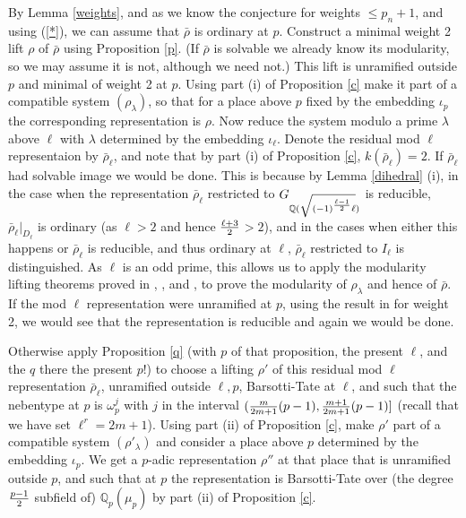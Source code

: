 \documentclass[12pt]{amsart}
\newcommand{\Q}{\mathbb{Q}}
\newcommand{\rhobar}{\overline{\rho}}
\def\rhobar{ {\bar {\rho} } }
\begin{document}
By  Lemma \ref{weights}, and as we know the conjecture for weights $\leq p_n+1$, and using (\ref{*}),
we can assume that $\rhobar$ is ordinary at $p$. 
Construct a minimal weight 2 
lift $\rho$ of $\rhobar$ using Proposition \ref{p}. (If $\rhobar$ is solvable we already know its modularity, so we may assume it is not, although we need not.) 
This lift is unramified outside $p$ and minimal of weight 2 at $p$.
Using part (i) of Proposition \ref{c} make it part of a compatible system $(\rho_{\lambda})$, so that for a place above $p$ fixed by the embedding $\iota_p$ the corresponding representation is $\rho$. 
Now reduce the system modulo a prime $\lambda$ above 
$\ell$ with $\lambda$ determined by the embedding $\iota_{\ell}$. 
Denote the residual  mod $\ell$ representaion by $\rhobar_\ell$, and note that by part (i) of Proposition \ref{c}, $k(\rhobar_\ell)=2$.
If $\rhobar_\ell$ had solvable image we would be done. This is because by Lemma \ref{dihedral} (i), 
in the case when the representation $\rhobar_\ell$ restricted to $G_{\Q(\sqrt{{(-1)}^{\ell-1 \over 2}\ell})}$ is reducible, 
$\rhobar_\ell|_{D_\ell}$ is ordinary (as $\ell>2$ and hence $\ell+3 \over 2$$>2$), 
and in the cases when either this happens or $\rhobar_\ell$ is reducible, and thus ordinary at $\ell$, 
$\rhobar_\ell$ restricted to $I_{\ell}$ is distinguished.  As $\ell$ is an odd prime, 
this allows us to apply the modularity lifting theorems 
proved in \cite{Wiles}, \cite{TW}, \cite{SW2} and \cite{SW3}, to prove the modularity of 
$\rho_\lambda$ and hence of $\rhobar$.
If the mod $\ell$ representation were unramified at 
$p$, using the result in \cite{KW} for weight 2, we 
would see that the representation is reducible and 
again we would be done.

Otherwise apply Proposition \ref{q}
(with $p$ of that proposition, the present $\ell$, and the $q$ there the present $p$!) 
to choose a lifting $\rho'$ of this residual mod $\ell$ representation $\rhobar_\ell$, unramified outside $\ell,p$, 
Barsotti-Tate at $\ell$,   and such  
that the nebentype at $p$ is $\omega_p^j$  
with $j$ in the interval $({m \over 2m+1} ({p-1}),{m+1 \over 2m+1} ({p-1})]$
(recall that we have set $\ell^r=2m+1$).
Using part (ii) of Proposition \ref{c}, make $\rho'$ part of a compatible system $(\rho'_{\lambda})$ and consider a place above $p$
determined by the embedding $\iota_p$. We get a $p$-adic representation $\rho''$ at that place 
that is unramified outside $p$, and such that
at $p$ the representation is Barsotti-Tate over (the degree $p-1 \over 2$ subfield of) $\Q_p(\mu_p)$ by part (ii) of Proposition \ref{c}. 
\end{document}
